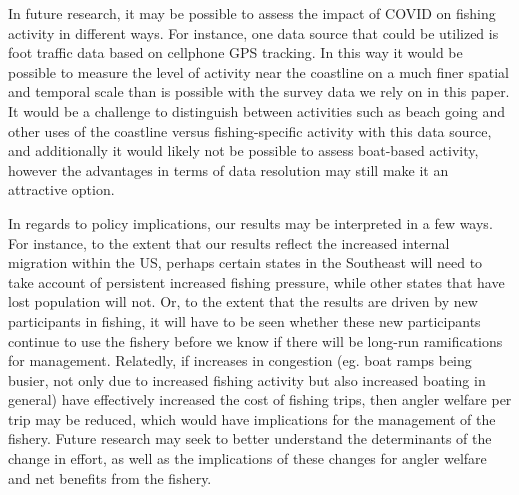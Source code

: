 \documentclass[12pt]{article}
\begin{document}
In future research, it may be possible to assess the impact of COVID on
fishing activity in different ways. For instance, one data source that
could be utilized is foot traffic data based on cellphone GPS tracking.
In this way it would be possible to measure the level of activity near
the coastline on a much finer spatial and temporal scale than is
possible with the survey data we rely on in this paper. It would be a
challenge to distinguish between activities such as beach going and
other uses of the coastline versus fishing-specific activity with this
data source, and additionally it would likely not be possible to assess
boat-based activity, however the advantages in terms of data resolution
may still make it an attractive option.

In regards to policy implications, our results may be interpreted in a
few ways. For instance, to the extent that our results reflect the
increased internal migration within the US, perhaps certain states in
the Southeast will need to take account of persistent increased fishing
pressure, while other states that have lost population will not. Or, to
the extent that the results are driven by new participants in fishing,
it will have to be seen whether these new participants continue to use
the fishery before we know if there will be long-run ramifications for
management. Relatedly, if increases in congestion (eg. boat ramps being
busier, not only due to increased fishing activity but also increased
boating in general) have effectively increased the cost of fishing
trips, then angler welfare per trip may be reduced, which would have
implications for the management of the fishery. Future research may seek
to better understand the determinants of the change in effort, as well
as the implications of these changes for angler welfare and net benefits
from the fishery.




\newpage{}



\newpage
\end{document}

